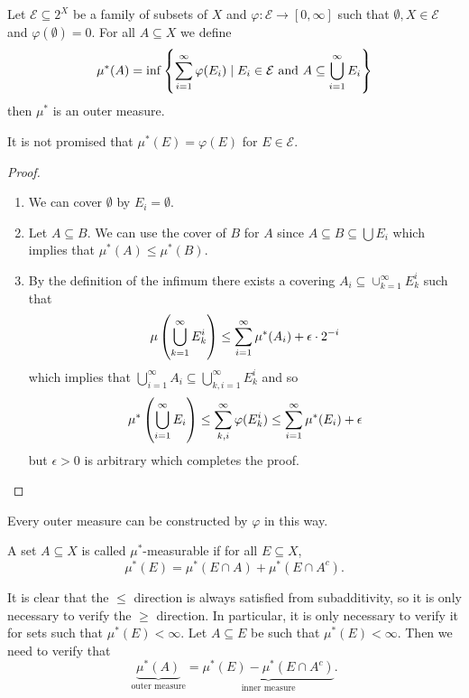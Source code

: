 \documentclass[11pt,a4paper]{article}
\begin{document}
\begin{proposition}
  Let $\mathcal E \subseteq 2^X$ be a family of subsets of $X$ and
  $\varphi \colon \mathcal E \to [0,\infty]$ such that
  $\emptyset, X \in \mathcal E$ and $\varphi(\emptyset) = 0$.
  For all $A \subseteq X$ we define
  \[
    \mu^*(A) = \inf\left\{\sum_{i=1}^{\infty} \varphi(E_i) \mid 
    E_i \in \mathcal E \text{ and } A \subseteq \bigcup_{i=1}^{\infty} E_i\right\}
  \]
  then $\mu^*$ is an outer measure.
\end{proposition}
\begin{remark}
  It is not promised that $\mu^*(E) = \varphi(E)$ for $E \in \mathcal E$.
\end{remark}
\begin{proof} \phantom{}
\begin{enumerate}
  \item[(1)] We can cover $\emptyset$ by $E_i = \emptyset$.
  \item[(2)] Let $A \subseteq B$.
    We can use the cover of $B$ for $A$ since 
    $A \subseteq B \subseteq \bigcup E_i$ which implies that
    $\mu^*(A) \le \mu^*(B)$.
  \item[(3)] By the definition of the infimum there exists a covering
    $A_i \subseteq \cup_{k=1}^{\infty} E_k^i$ such that
    \[
      \mu\del{\bigcup_{k=1}^{\infty} E_k^i} \le 
      \sum_{i=1}^{\infty} \mu^*(A_i) + \epsilon \cdot 2^{-i}
    \]
    which implies that 
    $\bigcup_{i=1}^{\infty} A_i \subseteq \bigcup_{k,i=1}^{\infty} E_k^i$
    and so
    \[
      \mu^*\del{\bigcup_{i=1}^{\infty} E_i} \le 
      \sum_{k,i}^{\infty} \varphi(E_k^i) \le
      \sum_{i=1}^{\infty} \mu^*(E_i) + \epsilon
    \]
    but $\epsilon > 0$ is arbitrary which completes the proof.
\end{enumerate}
\end{proof}

\begin{remark}
  Every outer measure can be constructed by $\varphi$ in this way.
\end{remark}

\begin{definition}
  A set $A \subseteq X$ is called $\mu^*$-measurable if for all $E \subseteq X$,
  \[
    \mu^*(E) = \mu^*(E \cap A) + \mu^*(E \cap A^c).
  \]
\end{definition}

\begin{remark}
  It is clear that the $\le$ direction is always satisfied from subadditivity,
  so it is only necessary to verify the $\geq$ direction.
  In particular, it is only necessary to verify it for sets such that
  $\mu^*(E) < \infty$.
  Let $A \subseteq E$ be such that $\mu^*(E) < \infty$.
  Then we need to verify that
  \[
    \underbrace{\mu^*(A)}_{\text{outer measure}} = 
    \underbrace{\mu^*(E) - \mu^*(E \cap A^c)}_{\text{inner measure}}.
  \]
\end{remark}
\end{document}

